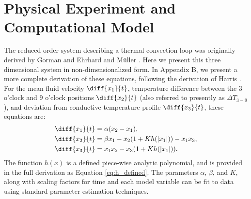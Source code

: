 \section*{Physical Experiment and Computational Model}

The reduced order system describing a thermal convection loop was originally derived by Gorman \cite{gorman1986} and Ehrhard and M\"{u}ller \cite{ehrhard1990dynamical}.
Here we present this three dimensional system in non-dimensionalized form.
In Appendix B, we present a more complete derivation of these equations, following the derivation of Harris \cite{harris2011predicting}.
For the mean fluid velocity $\diff{x_1}{t}$, temperature difference between the 3 o'clock and 9 o'clock positions $\diff{x_2}{t}$ (also referred to presently as $\Delta T_{3-9}$), and deviation from conductive temperature profile $\diff{x_3}{t}$, these equations are:
\begin{align}
& \diff{x_1}{t} = \alpha (x_2 - x_1),\\
& \diff{x_2}{t} = \beta x_1 - x_2 (1 + Kh(|x_1|)) - x_1x_3,\\
  & \diff{x_3}{t} = x_1x_2 - x_3 (1 + Kh(|x_1|)) .\end{align}
The function $h(x)$ is a defined piece-wise analytic polynomial, and is provided in the full derivation as Equation \ref{eq:h_defined}.
The parameters $\alpha$, $\beta$, and $K$, along with scaling factors for time and each model variable can be fit to data using standard parameter estimation techniques.

